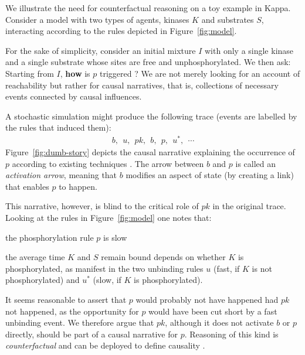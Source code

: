 
We illustrate the need for counterfactual reasoning on a toy example
in Kappa. Consider a model with two types of agents, kinases $K$ and
substrates $S$, interacting according to the rules depicted in
Figure~\ref{fig:model}.



For the sake of simplicity, consider an initial mixture $I$ with only
a single kinase and a single substrate whose sites are free and
unphosphorylated. We then ask: Starting from $I$, \textbf{how} is $p$
triggered ? We are not merely looking for an account of reachability
but rather for causal narratives, that is, collections of necessary
events connected by causal influences.

A stochastic simulation \cite{DanosEtAl-APLAS07} might produce the
following trace (events are labelled by the rules that induced them):
\begin{align}\label{example-trace} b,\ \ u,\ \ pk,\ \ b,\ \ p,\ \
  u^{*},\ \ \cdots
\end{align} Figure~\ref{fig:dumb-story} depicts the causal narrative
explaining the occurrence of $p$ according to existing techniques
\cite{DBLP:conf/fsttcs/DanosFFHH12,DanosEtAl-CONCUR07}. The arrow
between $b$ and $p$ is called an \textit{activation arrow}, meaning
that $b$ modifies an aspect of state (by creating a link) that enables
$p$ to happen.



This narrative, however, is blind to the critical role of $pk$ in the
original trace. Looking at the rules in Figure~\ref{fig:model} one
notes that:
\begin{inparaenum}[(i)]
\item the phosphorylation rule $p$ is slow
\item the average time $K$ and $S$ remain bound depends on whether $K$
  is phosphorylated, as manifest in the two unbinding rules $u$ (fast,
  if $K$ is not phosphorylated) and $u^{*}$ (slow, if $K$ is
  phosphorylated).
\end{inparaenum} It seems reasonable to assert that $p$ would probably
not have happened had $pk$ not happened, as the opportunity for $p$
would have been cut short by a fast unbinding event. We therefore
argue that $pk$, although it does not activate $b$ or $p$ directly,
should be part of a causal narrative for $p$. Reasoning of this kind
is \textit{counterfactual} and can be deployed to define causality
\cite{lewis1974causation,lewis2000causation}.

